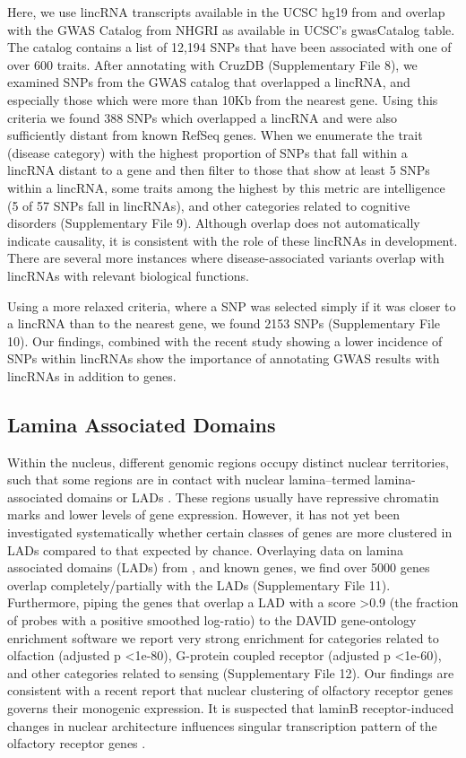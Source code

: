 \documentclass{bioinfo}
\begin{document}
Here, we use lincRNA transcripts available in the UCSC hg19 from \citep{Cabili} and overlap  with the GWAS Catalog from NHGRI \citep{Hindorff} as available in UCSC's gwasCatalog table. The catalog contains a list of 12,194 SNPs that have been associated with one of over 600 traits. After annotating with CruzDB (Supplementary File 8), we examined SNPs from the GWAS catalog that overlapped a lincRNA, and especially those which were more than 10Kb from the nearest gene. Using this criteria we found 388 SNPs which overlapped a lincRNA and were also sufficiently distant from known RefSeq genes. When we enumerate the trait (disease category) with the highest proportion of SNPs that fall within a lincRNA distant to a gene and then filter to those that show at least 5 SNPs within a lincRNA, some traits among the highest by this metric are intelligence (5 of 57 SNPs fall in lincRNAs), and other categories related to cognitive disorders (Supplementary File 9). Although overlap does not automatically indicate causality, it is consistent with the role of these lincRNAs in development. There are several more instances where disease-associated variants overlap with lincRNAs with relevant biological functions. 

Using a more relaxed criteria, where a SNP was selected simply if it was closer to a lincRNA than to the nearest gene, we found 2153 SNPs (Supplementary File 10). Our findings, combined with the recent study showing a lower incidence of SNPs within lincRNAs \citep{Chen} show the importance of annotating GWAS results with lincRNAs in addition to genes.

\subsection{Lamina Associated Domains}
Within the nucleus, different genomic regions occupy distinct nuclear territories, such that some regions are in contact with nuclear lamina--termed lamina-associated domains or LADs \citep{Guelen,Dittmer}. These regions usually have repressive chromatin marks and lower levels of gene expression. However, it has not yet been investigated systematically whether certain classes of genes are more clustered in LADs compared to that expected by chance. Overlaying data on lamina associated domains (LADs) from \citep{Guelen}, and known genes, we find over 5000 genes overlap completely/partially with the LADs (Supplementary File 11). Furthermore, piping the genes that overlap a LAD with a score \textgreater 0.9 (the fraction of probes with a positive smoothed log-ratio) to the DAVID gene-ontology enrichment software \citep{Huang} we report very strong enrichment for categories related to olfaction (adjusted p \textless 1e-80), G-protein coupled receptor (adjusted p \textless 1e-60), and other categories related to sensing (Supplementary File 12).  Our findings are consistent with a recent report \citep{Clowney} that nuclear clustering of olfactory receptor genes governs their monogenic expression. It is suspected that laminB receptor-induced changes in nuclear architecture influences singular transcription pattern of the olfactory receptor genes \citep{Clowney}.
\end{document}
